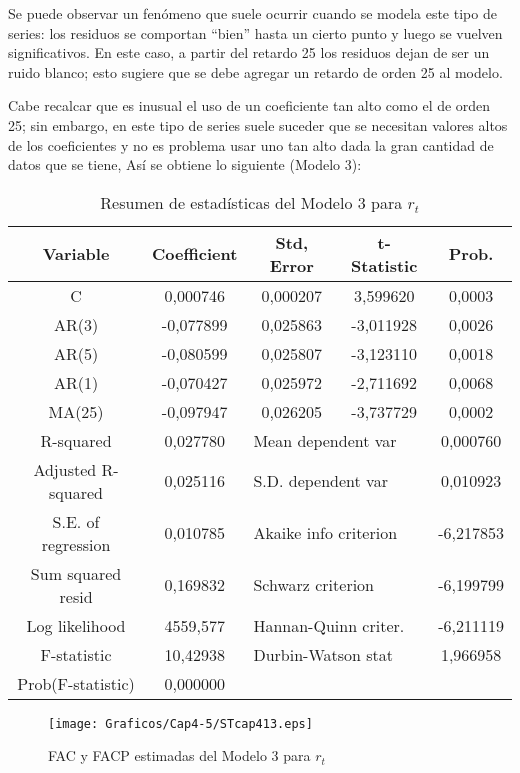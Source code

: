 Se puede observar un fen\'{o}meno que suele ocurrir cuando se modela este tipo de series: los residuos se comportan ``bien'' hasta un cierto punto y luego se vuelven significativos. En este caso, a partir del retardo 25 los residuos dejan de ser un ruido blanco; esto sugiere que se debe agregar un retardo de orden 25 al modelo.\newline

Cabe recalcar que es inusual el uso de un coeficiente tan alto como el de orden 25; sin embargo, en este tipo de series suele suceder que se necesitan valores altos de los coeficientes y no es problema usar uno tan alto dada la gran cantidad de datos que se tiene, As\'{i} se obtiene lo siguiente (Modelo 3):

\begin{table}[H]
\centering
\begin{tabular}{ccccc}\hline\hline
Variable & Coefficient & Std, Error & t-Statistic & Prob.\\ \hline\hline
C & 0,000746 & 0,000207 & 3,599620 & 0,0003 \\
AR(3) & -0,077899 & 0,025863 & -3,011928 & 0,0026 \\
AR(5) & -0,080599 & 0,025807 & -3,123110 & 0,0018 \\
AR(1) & -0,070427 & 0,025972 & -2,711692 & 0,0068 \\
MA(25) & -0,097947 & 0,026205 & -3,737729 & 0,0002 \\ \hline\hline
R-squared & 0,027780 & \multicolumn{2}{l}{Mean dependent var} & 0,000760 \\
Adjusted R-squared & 0,025116 & \multicolumn{2}{l}{S.D. dependent var} & 0,010923 \\
S.E. of regression & 0,010785 & \multicolumn{2}{l}{Akaike info criterion} & -6,217853 \\
Sum squared resid & 0,169832 & \multicolumn{2}{l}{Schwarz criterion} & -6,199799 \\
Log likelihood & 4559,577 & \multicolumn{2}{l}{Hannan-Quinn criter.} & -6,211119 \\
F-statistic & 10,42938 & \multicolumn{2}{l}{Durbin-Watson stat} & 1,966958 \\
Prob(F-statistic) & 0,000000 & & & \\ \hline\hline
\end{tabular}
\caption{Resumen de estad\'{i}sticas del Modelo 3 para $r_{t}$}
\end{table}

\begin{figure}[H]
\centering
\texttt{[image: Graficos/Cap4-5/STcap413.eps]}
\caption{FAC y FACP estimadas del Modelo 3 para $r_{t}$}
\end{figure}


